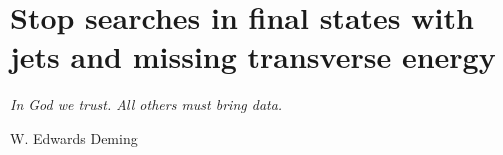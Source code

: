 \chapter{Stop searches in final states with jets and missing transverse energy}
\label{ch:stop_ana}
\epigraph{\emph{In God we trust. All others must bring data.}}{W. Edwards Deming}



			
			






